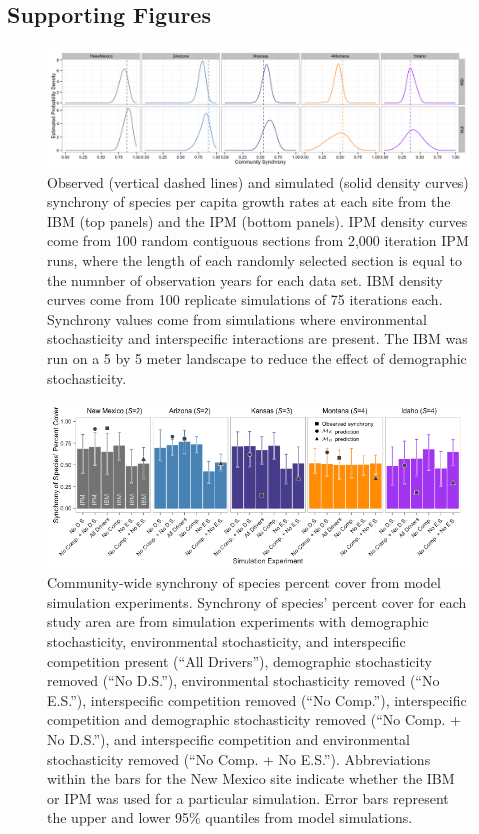 \documentclass[12pt,]{article}
\begin{document}
\newpage{}

\subsection{Supporting Figures}\label{supporting-figures}

\begin{figure}[!ht]
  \centering
      \includegraphics[width=6in]{./components/figureS1.png}
  \caption{Observed (vertical dashed lines) and simulated (solid density curves) synchrony of species per capita growth rates at each site from the IBM (top panels) and the IPM (bottom panels). IPM density curves come from 100 random contiguous sections from 2,000 iteration IPM runs, where the length of each randomly selected section is equal to the numnber of observation years for each data set. IBM density curves come from 100 replicate simulations of 75 iterations each. Synchrony values come from simulations where environmental stochasticity and interspecific interactions are present. The IBM was run on a 5 by 5 meter landscape to reduce the effect of demographic stochasticity.}
\end{figure}

\pagebreak{}

\begin{figure}[!ht]
  \centering
      \includegraphics[width=6in]{./components/formatted_figures/formatted_figureS2.png}
  \caption{Community-wide synchrony of species percent cover from model simulation experiments. Synchrony of species' percent cover for each study area are from simulation experiments with demographic stochasticity, environmental stochasticity, and interspecific competition present (``All Drivers''), demographic stochasticity removed (``No D.S.''), environmental stochasticity removed (``No E.S.''), interspecific competition removed (``No Comp.''), interspecific competition and demographic stochasticity removed (``No Comp. + No D.S.''), and interspecific competition and environmental stochasticity removed (``No Comp. + No E.S.''). Abbreviations within the bars for the New Mexico site indicate whether the IBM or IPM was used for a particular simulation. Error bars represent the upper and lower 95\% quantiles from model simulations.}
\end{figure}
\end{document}
